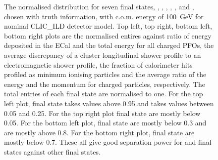 \documentclass[a4paper,11pt]{article}
\begin{document}
\begin{figure}[htbp]
\caption{\label{fig:more_lep} The normalised distribution for seven final states, \Pem\APnue\Pnu, \Pmuon\APnum\Pnut, \Ppiminus\Pnut, \Pphoton\Pnut, \Pphoton\Pnut, \Ppiminus\Pnut and \Pphoton\Pnut, chosen with truth information,  with c.o.m. energy of 100 \,GeV for nominal CLIC\_ILD detector model. Top left, top right, bottom left, bottom right plots are the normalised entires against ratio of energy deposited in the ECal and the total energy for all charged PFOs, the average discrepancy of a  cluster longitudinal shower profile to an electromagnetic shower profile, the fraction of calorimeter hits profiled as minimum ionising particles and the average ratio  of the energy and the momentum for charged particles, respectively. The total entries of each final state are normalised to one. For the top left plot, \Pepm final state takes values above 0.95 and \Pmupm takes values between 0.05 and 0.25. For the top right plot \Pepm final state are mostly below 0.05. For the bottom left plot, \Pepm final state are mostly below 0.3 and \Pmupm are mostly above 0.8. For the bottom right plot,  \Pmupm final state are mostly below 0.7. These all give good separation power for \Pem\APnue\Pnu and \Pmuon\APnum\Pnut final states against other final states.}
\end{figure}
\end{document}
